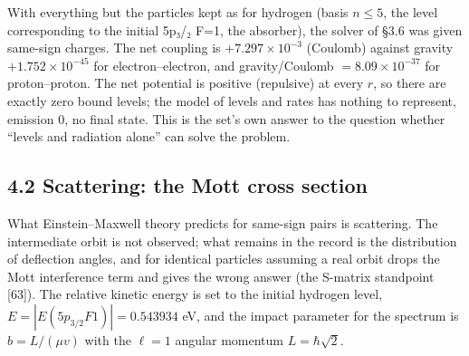 \documentclass[
  a4paper,
]{article}
\begin{document}
With everything but the particles kept as for hydrogen (basis \(n\le5\),
the level corresponding to the initial 5p₃/₂ F=1, the absorber), the
solver of §3.6 was given same-sign charges. The net coupling is
\(+7.297\times10^{-3}\) (Coulomb) against gravity
\(+1.752\times10^{-45}\) for electron--electron, and gravity/Coulomb
\(=8.09\times10^{-37}\) for proton--proton. The net potential is
positive (repulsive) at every \(r\), so there are exactly zero bound
levels; the model of levels and rates has nothing to represent, emission
0, no final state. This is the set's own answer to the question whether
``levels and radiation alone'' can solve the problem.

\subsection{4.2 Scattering: the Mott cross
section}\label{scattering-the-mott-cross-section}

What Einstein--Maxwell theory predicts for same-sign pairs is
scattering. The intermediate orbit is not observed; what remains in the
record is the distribution of deflection angles, and for identical
particles assuming a real orbit drops the Mott interference term and
gives the wrong answer (the S-matrix standpoint {[}63{]}). The relative
kinetic energy is set to the initial hydrogen level,
\(E=|E(5p_{3/2}F1)|=0.543934\) eV, and the impact parameter for the
spectrum is \(b=L/(\mu v)\) with the \(\ell=1\) angular momentum
\(L=\hbar\sqrt2\).
\end{document}
